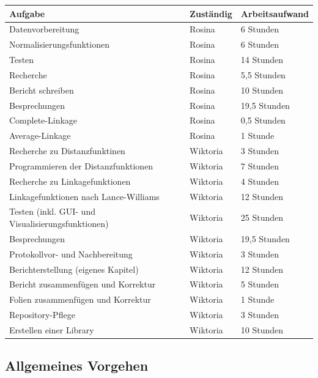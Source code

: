 \documentclass[12pt]{article}
\begin{document}
\begin{table}[h!]
	\centering
	\begin{tabular}{l|l|l}
		Aufgabe                       & Zuständig & Arbeitsaufwand \\ 
		\hline
		Datenvorbereitung             & Rosina    & 6 Stunden        \\
		Normalisierungsfunktionen     & Rosina    & 6 Stunden           \\ 
		Testen                        & Rosina    & 14 Stunden        \\
		Recherche                     & Rosina    & 5,5 Stunden        \\
		Bericht schreiben             & Rosina    & 10 Stunden        \\
		Besprechungen                 & Rosina    & 19,5 Stunden        \\
		Complete-Linkage              & Rosina    & 0,5 Stunden        \\ 
		Average-Linkage               & Rosina    & 1 Stunde         \\ 
		Recherche zu Distanzfunktinen 						& Wiktoria  & 3 Stunden \\
		Programmieren der Distanzfunktionen      			& Wiktoria  & 7 Stunden \\ 
		Recherche zu Linkagefunktionen 						& Wiktoria  & 4 Stunden \\
		Linkagefunktionen nach Lance-Williams   			& Wiktoria  & 12 Stunden   \\
		Testen (inkl. GUI- und Visualisierungsfunktionen)   & Wiktoria  & 25 Stunden  \\ 
		Besprechungen 				 						& Wiktoria  & 19,5 Stunden  \\
		Protokollvor- und Nachbereitung 					& Wiktoria  & 3 Stunden \\
		Berichterstellung (eigenes Kapitel)					& Wiktoria  & 12 Stunden \\
		Bericht zusammenfügen und Korrektur                 & Wiktoria  & 5 Stunden \\
		Folien zusammenfügen und Korrektur 					& Wiktoria  & 1 Stunde \\
		Repository-Pflege 									& Wiktoria  & 3 Stunden \\
		Erstellen einer Library 							& Wiktoria  & 10 Stunden \\
	\end{tabular}
\end{table}

\subsection{Allgemeines Vorgehen}
\label{allgemein-clusterung}
\end{document}
